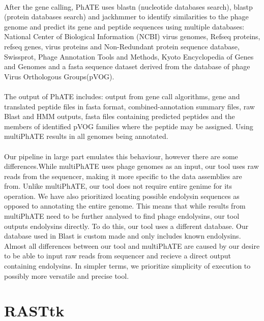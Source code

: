 \paragraph*{}
After the gene calling, PhATE uses blastn (nucleotide databases search), blastp (protein databases search) and jackhmmer to identify similarities to the phage genome and predict its gene and peptide sequences using multiple databases: National Center of Biological Information (NCBI) virus genomes, Refseq proteins, refseq genes, virus proteins and Non-Redundant protein sequence database, Swissprot, Phage Annotation Tools and Methods, Kyoto Encyclopedia of Genes and Genomes and a fasta sequence dataset derived from the database of phage Virus Orthologous Groups(pVOG).
\paragraph*{}
The output of PhATE includes: output from gene call algorithms, gene and translated peptide files in fasta format, combined-annotation summary files, raw Blast and HMM outputs, fasta files containing predicted peptides and the members of identified pVOG families where the peptide may be assigned. Using multiPhATE results in all genomes being annotated.
\paragraph*{}
Our pipeline in large part emulates this behaviour, however there are some differences.While multiPhATE uses phage genomes as an input, our tool uses raw reads from the sequencer, making it more specific to the data assemblies are from. Unlike multiPhATE, our tool does not require entire genime for its operation. We have also prioritized locating possible endolysin sequences as opposed to annotating the entire genome. This means that while results from multiPhATE need to be further analysed to find phage endolysins, our tool outputs endolysins directly. To do this, our tool uses a different database. Our database used in Blast is custom made and only includes known endolysins. Almost all differences between our tool and multiPhATE are caused by our desire to be able to input raw reads from sequencer and recieve a direct output containing endolysins. In simpler terms, we prioritize simplicity of execution to possibly more versatile and precise tool.

\section{RASTtk}

